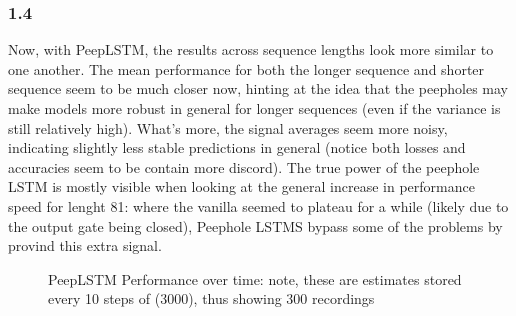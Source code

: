 \subsubsection*{1.4}
Now, with PeepLSTM, the results across sequence lengths look more similar to one another. The mean performance for 
both the longer sequence and shorter sequence seem to be much closer now, hinting at the idea that the peepholes
may make models more robust in general for longer sequences (even if the variance is still relatively high). What's
more, the signal averages seem more noisy, indicating slightly less stable predictions in general (notice both
losses and accuracies seem to be contain more discord). The true power of the peephole LSTM is mostly visible
when looking at the general increase in performance speed for lenght 81: where the vanilla seemed to plateau for
a while (likely due to the output gate being closed), Peephole LSTMS bypass some of the problems by provind this extra signal.

\begin{figure}[h]%
    \centering
    \qquad
    \caption{PeepLSTM Performance over time: note, these are estimates stored every 10 steps of (3000), thus showing 300 recordings}%
    \label{fig:defaults}%
\end{figure}

